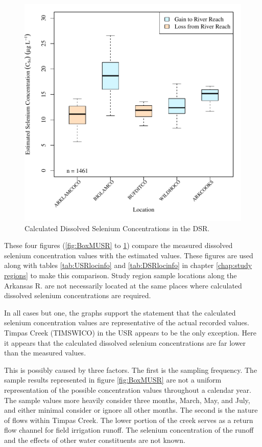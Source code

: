 \begin{figure}[htbp]
\centering
	\includegraphics[width=6in]{"Figures/Results_DSR/Stochastic/c BOX Estimated CSe"}
	\caption[Calculated Dissolved Selenium Concentrations in the DSR.]{Calculated Dissolved Selenium Concentrations in the DSR.}
	\label{fig:BoxCDSR}
\end{figure}
These four figures (\ref{fig:BoxMUSR} to \ref{fig:BoxCDSR}) compare the measured dissolved selenium concentration values with the estimated values.  These figures are used along with tables \ref{tab:USRlocinfo} and \ref{tab:DSRlocinfo} in chapter \ref{chap:study regions} to make this comparison.  Study region sample locations along the Arkansas R. are not necessarily located at the same places where calculated dissolved selenium concentrations are required.

In all cases but one, the graphs support the statement that the calculated selenium concentration values are representative of the actual recorded values.  Timpas Creek (TIMSWICO) in the USR appears to be the only exception.  Here it appears that the calculated dissolved selenium concentrations are far lower than the measured values.  

This is possibly caused by three factors.  The first is the sampling frequency.  The sample results represented in figure \ref{fig:BoxMUSR} are not a uniform representation of the possible concentration values throughout a calendar year.  The sample values more heavily consider three months, March, May, and July, and either minimal consider or ignore all other months.  The second is the nature of flows within Timpas Creek.  The lower portion of the creek serves as a return flow channel for field irrigation runoff.  The selenium concentration of the runoff and the effects of other water constituents are not known.  

